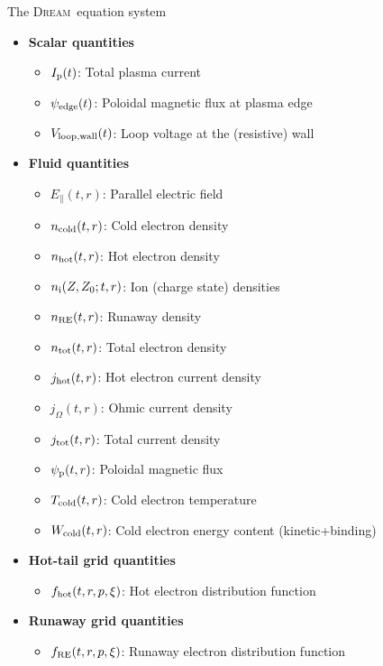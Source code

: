 \documentclass[titleunderline,widescreen1610]{chalmerspresentation}
\newcommand{\DREAM}{\textsc{Dream}}
\newcommand{\Efield}{E_\parallel}
\newcommand{\fhot}{f_{\rm hot}}
\newcommand{\fre}{f_{\rm RE}}
\newcommand{\Ip}{I_{\rm p}}
\newcommand{\ncold}{n_{\rm cold}}
\newcommand{\nhot}{n_{\rm hot}}
\newcommand{\ions}{n_{\rm i}}
\newcommand{\nre}{n_{\rm RE}}
\newcommand{\ntot}{n_{\rm tot}}
\newcommand{\jhot}{j_{\rm hot}}
\newcommand{\johm}{j_{\Omega}}
\newcommand{\jtot}{j_{\rm tot}}
\newcommand{\psiedge}{\psi_{\rm edge}}
\newcommand{\Vloopwall}{V_{\rm loop, wall}}
\newcommand{\psip}{\psi_{\rm p}}
\newcommand{\Tcold}{T_{\rm cold}}
\newcommand{\Wcold}{W_{\rm cold}}
\begin{document}
    \begin{frame}{The \DREAM\ equation system}
        \begin{itemize}
            \item {\bf Scalar quantities}
            \begin{itemize}
                \item $\Ip(t)$: Total plasma current
                \item $\psiedge(t)$: Poloidal magnetic flux at plasma edge
                \item $\Vloopwall(t)$: Loop voltage at the (resistive) wall
            \end{itemize}
            \item {\bf Fluid quantities}
            \begin{itemize}
                \item $\Efield(t,r)$: Parallel electric field
                \item $\ncold(t,r)$: Cold electron density
                \item $\nhot(t,r)$: Hot electron density
                \item $\ions(Z,Z_0;t,r)$: Ion (charge state) densities
                \item $\nre(t,r)$: Runaway density
                \item $\ntot(t,r)$: Total electron density
                \item $\jhot(t,r)$: Hot electron current density
                \item $\johm(t,r)$: Ohmic current density
                \item $\jtot(t,r)$: Total current density
                \item $\psip(t,r)$: Poloidal magnetic flux
                \item $\Tcold(t,r)$: Cold electron temperature
                \item $\Wcold(t,r)$: Cold electron energy content (kinetic+binding)
            \end{itemize}
            \item {\bf Hot-tail grid quantities}
            \begin{itemize}
                \item $\fhot(t,r,p,\xi)$: Hot electron distribution function
            \end{itemize}
            \item {\bf Runaway grid quantities}
            \begin{itemize}
                \item $\fre(t,r,p,\xi)$: Runaway electron distribution function
            \end{itemize}
        \end{itemize}
    \end{frame}
\end{document}
